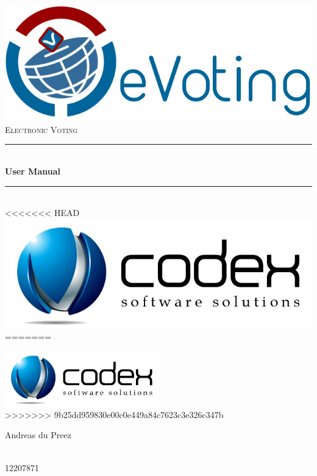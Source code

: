 \begin{titlepage}
	
	\begin{center}
		\includegraphics[width=0.7\linewidth]{../Images/eVoting_Logo.png}\\[2cm]    
		\textsc{\LARGE Electronic Voting}\\[0.5cm]
		\rule{\linewidth}{0.5mm} \\[1cm]
		{ \huge \bfseries User Manual}\\[0.5cm]
		\rule{\linewidth}{0.5mm} \\[1cm]
		
<<<<<<< HEAD
		\includegraphics[width=0.5\linewidth]{../Images/TeamCodexLogo.jpg}\\[0.5cm]    	
=======
		
		\includegraphics[width=0.5\textwidth]{../Images/TeamCodexLogo.jpg}\\[0.5cm]    	
>>>>>>> 9b25dd959830e00c0e449a84c7623c3e326c347b
		
		
		\begin{minipage}{0.4\textwidth}
			\begin{flushleft} \large
				Andreas {du Preez}
			\end{flushleft}
		\end{minipage}
		\begin{minipage}{0.4\textwidth}
			\begin{flushright} \large
				\emph{} \\
				12207871 
			\end{flushright}
		\end{minipage}
		

\end{center}
\end{titlepage}
